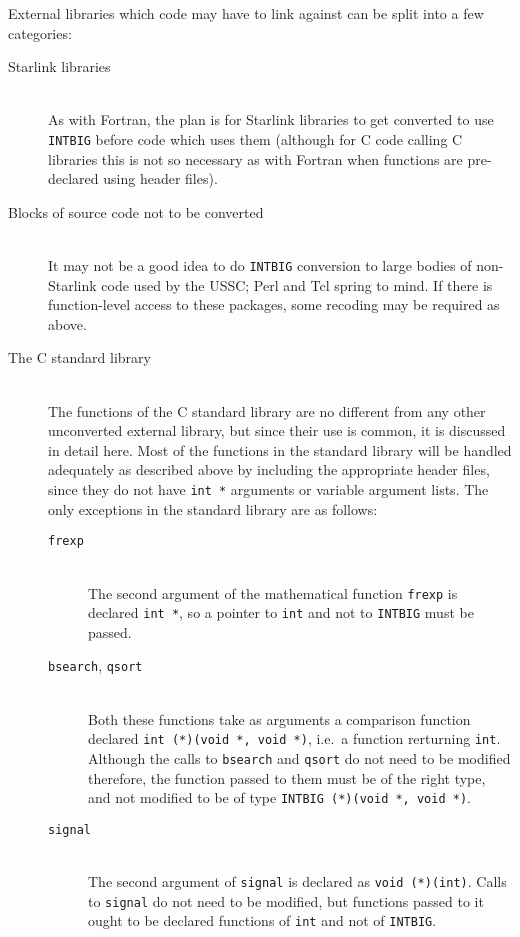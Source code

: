 \documentclass[twoside,11pt]{article}
\newcommand{\html}[1]{}
\renewcommand{\_}{\texttt{\symbol{95}}}
\newcommand{\cc}[1]{{\tt #1}}
\newcommand{\ditem}[1]{\item[#1]\mbox{}\\}
\newenvironment{squote}{\begin{quote}\begin{small}}{\end{small}\end{quote}}
\begin{document}
External libraries which code may have to link against
can be split into a few categories:
\begin{description}
%
\ditem{Starlink libraries}
As with Fortran, the plan is for Starlink libraries to get converted
to use \cc{INT\_BIG}
before code which uses them (although for C code calling C libraries
this is not so necessary as with Fortran when functions are pre-declared
using header files).
\html{\begin{squote}\end{squote}}
%
\ditem{Blocks of source code not to be converted}
It may not be a good idea to do \cc{INT\_BIG} conversion to
large bodies of non-Starlink code used by the USSC; Perl and Tcl
spring to mind.
If there is function-level access to these packages,
some recoding may be required as above.
\html{\begin{squote}\end{squote}}
%
\ditem{The C standard library}
The functions of the C standard library are no different from any
other unconverted external library, but since their use is
common, it is discussed in detail here.
Most of the functions in the standard library will be handled
adequately as described above by including the appropriate header files,
since they do not have \cc{int~*} arguments or variable argument lists.
The only exceptions in the standard library are as follows:
\begin{description}
%
\ditem{\cc{frexp}}
The second argument of the mathematical function \cc{frexp} is declared
\cc{int *}, so a pointer to \cc{int} and not to \cc{INT\_BIG} must be passed.
\html{\begin{squote}\end{squote}}
%
\ditem{\cc{bsearch}, \cc{qsort}}
Both these functions take as arguments a comparison function
declared \cc{int (*)(void *, void *)},
i.e.\ a function rerturning \cc{int}.
Although the calls to \cc{bsearch} and \cc{qsort} do not need to be
modified therefore, the function passed to them must be of the right
type, and not modified to be of type \cc{INT\_BIG (*)(void *, void *)}.
\html{\begin{squote}\end{squote}}
%
\ditem{\cc{signal}}
The second argument of \cc{signal} is declared as \cc{void (*)(int)}.
Calls to \cc{signal} do not need to be modified, but functions
passed to it ought to be declared
functions of \cc{int} and not of \cc{INT\_BIG}.
\html{\begin{squote}\end{squote}}

\end{description}
\end{description}
\end{document}
